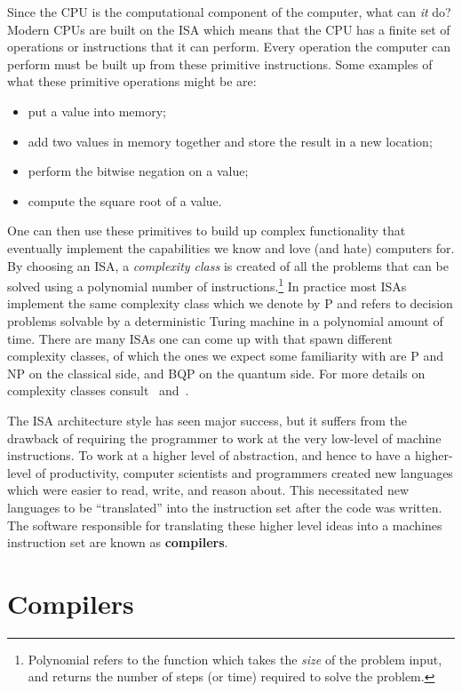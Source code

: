 Since the \ac{CPU} is the computational component of the computer, what can \emph{it} do?
Modern \acp{CPU} are built on the \ac{ISA} which means that the \ac{CPU} has a finite set of operations or instructions that it can perform.
Every operation the computer can perform must be built up from these primitive instructions.
Some examples of what these primitive operations might be are:
\begin{itemize}
    \item put a value into memory;
    \item add two values in memory together and store the result in a new location;
    \item perform the bitwise negation on a value;
    \item compute the square root of a value.
\end{itemize}
One can then use these primitives to build up complex functionality that eventually implement the capabilities we know and love (and hate) computers for.
By choosing an \ac{ISA}, a \emph{complexity class} is created of all the problems that can be solved using a polynomial number of instructions.\footnote{Polynomial refers to the function which takes the \emph{size} of the problem input, and returns the number of steps (or time) required to solve the problem.}
In practice most \acp{ISA} implement the same complexity class which we denote by P and refers to decision problems solvable by a deterministic Turing machine in a polynomial amount of time. %
There are many \acp{ISA} one can come up with that spawn different complexity classes, of which the ones we expect some familiarity with are P and NP on the classical side, and BQP on the quantum side.
For more details on complexity classes consult~\cite{complexity} and~\cite[Chapter 3]{nielsenchuang}.

The \ac{ISA} architecture style has seen major success, but it suffers from the drawback of requiring the programmer to work at the very low-level of machine instructions.
To work at a higher level of abstraction, and hence to have a higher-level of productivity, computer scientists and programmers created new languages which were easier to read, write, and reason about.
This necessitated new languages to be ``translated'' into the instruction set after the code was written.
The software responsible for translating these higher level ideas into a machines instruction set are known as \textbf{compilers}.

\section{Compilers}

